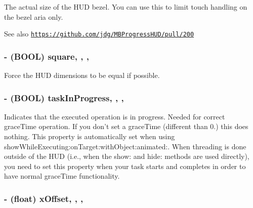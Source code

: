 The actual size of the H\+U\+D bezel. You can use this to limit touch handling on the bezel aria only. \begin{DoxySeeAlso}{See also}
\href{https://github.com/jdg/MBProgressHUD/pull/200}{\tt https\+://github.\+com/jdg/\+M\+B\+Progress\+H\+U\+D/pull/200} 
\end{DoxySeeAlso}
\hypertarget{interface_m_b_progress_h_u_d_a4bf7271b213e304259aa7d97f7cb1849}{
\subsubsection[{square}]{\setlength{\rightskip}{0pt plus 5cm}-\/ (B\+O\+O\+L) square\hspace{0.3cm}{\ttfamily [read]}, {\ttfamily [write]}, {\ttfamily [atomic]}, {\ttfamily [assign]}}}\label{interface_m_b_progress_h_u_d_a4bf7271b213e304259aa7d97f7cb1849}
Force the H\+U\+D dimensions to be equal if possible. \hypertarget{interface_m_b_progress_h_u_d_a6077ea42c37c18b3058ed63ac10ede8f}{
\subsubsection[{task\+In\+Progress}]{\setlength{\rightskip}{0pt plus 5cm}-\/ (B\+O\+O\+L) task\+In\+Progress\hspace{0.3cm}{\ttfamily [read]}, {\ttfamily [write]}, {\ttfamily [atomic]}, {\ttfamily [assign]}}}\label{interface_m_b_progress_h_u_d_a6077ea42c37c18b3058ed63ac10ede8f}
Indicates that the executed operation is in progress. Needed for correct grace\+Time operation. If you don't set a grace\+Time (different than 0.) this does nothing. This property is automatically set when using show\+While\+Executing\+:on\+Target\+:with\+Object\+:animated\+:. When threading is done outside of the H\+U\+D (i.\+e., when the show\+: and hide\+: methods are used directly), you need to set this property when your task starts and completes in order to have normal grace\+Time functionality. \hypertarget{interface_m_b_progress_h_u_d_a4e6ee114c04b90ced1a253a6d33ba785}{
\subsubsection[{x\+Offset}]{\setlength{\rightskip}{0pt plus 5cm}-\/ (float) x\+Offset\hspace{0.3cm}{\ttfamily [read]}, {\ttfamily [write]}, {\ttfamily [atomic]}, {\ttfamily [assign]}}}\label{interface_m_b_progress_h_u_d_a4e6ee114c04b90ced1a253a6d33ba785}
